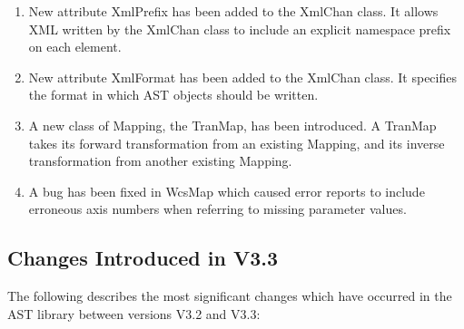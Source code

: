 \documentclass[twoside,11pt]{starlink}
\begin{document}
\begin{enumerate}
\item New attribute XmlPrefix has been added to the XmlChan class. It
allows XML written by the XmlChan class to include an explicit namespace
prefix on each element.

\item New attribute XmlFormat has been added to the XmlChan class. It
specifies the format in which AST objects should be written.

\item A new class of Mapping, the TranMap, has been introduced. A TranMap
takes its forward transformation from an existing Mapping, and its inverse
transformation from another existing Mapping.

\item A bug has been fixed in WcsMap which caused error reports to
include erroneous axis numbers when referring to missing parameter values.

\end{enumerate}

\subsection{Changes Introduced in V3.3}

The following describes the most significant changes which have
occurred in the AST library between versions V3.2 and V3.3:
\end{document}
